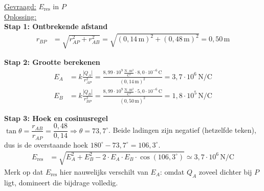 \documentclass{ximera}
\begin{document}
\begin{exercise}
\begin{solution}
        \underline{Gevraagd:} $E_{\text{res}}$ in $P$\\

        \underline{Oplossing:}\\
        \textbf{Stap 1: Ontbrekende afstand}
        \begin{align*}
            r_{BP} &= \sqrt{r_{AP}^{2} + r_{AB}^{2}} = \sqrt{(0{,}14 \, \mathrm{m})^{2} + (0{,}48 \, \mathrm{m})^{2}} = 0{,}50 \, \mathrm{m}
        \end{align*}

        \textbf{Stap 2: Grootte berekenen}
        \begin{align*}
            E_{A} &= k \frac{|Q_{A}|}{r_{AP}^{2}} = \frac{8{,}99 \cdot 10^{9} \, \mathrm{\frac{N \cdot m^2}{C^2}} \cdot 8{,}0 \cdot 10^{-6} \, \mathrm{C}}{(0{,}14 \, \mathrm{m})^{2}} = 3{,}7 \cdot 10^{6} \, \mathrm{N/C} \\
            E_{B} &= k \frac{|Q_{B}|}{r_{BP}^{2}} = \frac{8{,}99 \cdot 10^{9} \, \mathrm{\frac{N \cdot m^2}{C^2}} \cdot 5{,}0 \cdot 10^{-6} \, \mathrm{C}}{(0{,}50 \, \mathrm{m})^{2}} = 1{,}8 \cdot 10^{5} \, \mathrm{N/C}
        \end{align*}

        \textbf{Stap 3: Hoek en cosinusregel}\\
        $\tan\theta = \dfrac{r_{AB}}{r_{AP}} = \dfrac{0{,}48}{0{,}14} \Rightarrow \theta = 73{,}7^\circ$. Beide ladingen zijn negatief (hetzelfde teken), dus is de overstaande hoek $180^\circ - 73{,}7^\circ = 106{,}3^\circ$.
        \begin{align*}
            E_{\text{res}} &= \sqrt{E_A^{2} + E_B^{2} - 2 \cdot E_A \cdot E_B \cdot \cos(106{,}3^\circ)} \simeq \boxed{3{,}7 \cdot 10^{6} \, \mathrm{N/C}}
        \end{align*}
        Merk op dat $E_{\text{res}}$ hier nauwelijks verschilt van $E_A$: omdat $Q_A$ zoveel dichter bij $P$ ligt, domineert die bijdrage volledig.
    \end{solution}
\end{exercise}
\end{document}
